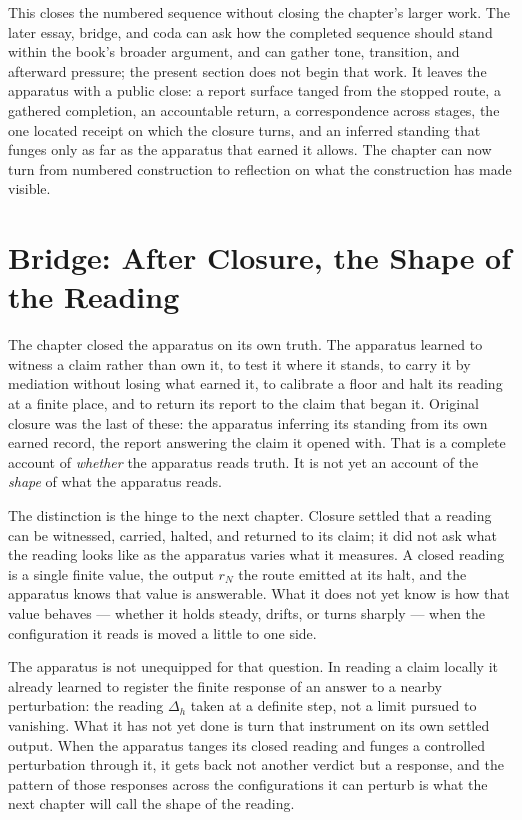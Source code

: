 This closes the numbered sequence without closing the chapter's larger work. The
later essay, bridge, and coda can ask how the completed sequence should stand
within the book's broader argument, and can gather tone, transition, and
afterward pressure; the present section does not begin that work. It leaves the
apparatus with a public close: a report surface tanged from the stopped route, a
gathered completion, an accountable return, a correspondence across stages, the
one located receipt on which the closure turns, and an inferred standing that
funges only as far as the apparatus that earned it
allows. The chapter can now turn from numbered construction to reflection on what
the construction has made visible.

\section*{Bridge: After Closure, the Shape of the Reading}

The chapter closed the apparatus on its own truth. The apparatus learned to witness a claim rather than own it, to test it where it stands, to carry it by mediation without losing what earned it, to calibrate a floor and halt its reading at a finite place, and to return its report to the claim that began it. Original closure was the last of these: the apparatus inferring its standing from its own earned record, the report answering the claim it opened with. That is a complete account of \emph{whether} the apparatus reads truth. It is not yet an account of the \emph{shape} of what the apparatus reads.

The distinction is the hinge to the next chapter. Closure settled that a reading can be witnessed, carried, halted, and returned to its claim; it did not ask what the reading looks like as the apparatus varies what it measures. A closed reading is a single finite value, the output $r_N$ the route emitted at its halt, and the apparatus knows that value is answerable. What it does not yet know is how that value behaves --- whether it holds steady, drifts, or turns sharply --- when the configuration it reads is moved a little to one side.

The apparatus is not unequipped for that question. In reading a claim locally it already learned to register the finite response of an answer to a nearby perturbation: the reading $\Delta_h$ taken at a definite step, not a limit pursued to vanishing. What it has not yet done is turn that instrument on its own settled output. When the apparatus tanges its closed reading and funges a controlled perturbation through it, it gets back not another verdict but a response, and the pattern of those responses across the configurations it can perturb is what the next chapter will call the shape of the reading.

